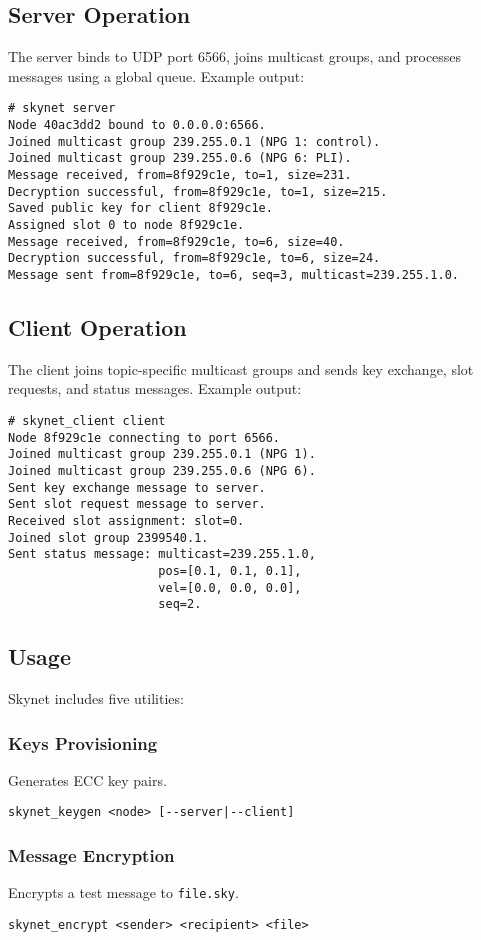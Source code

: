\documentclass{article}
\begin{document}
\subsection{Server Operation}
The server binds to UDP port 6566, joins multicast groups, and processes messages using a global
queue. Example output:
\begin{lstlisting}
# skynet server
Node 40ac3dd2 bound to 0.0.0.0:6566.
Joined multicast group 239.255.0.1 (NPG 1: control).
Joined multicast group 239.255.0.6 (NPG 6: PLI).
Message received, from=8f929c1e, to=1, size=231.
Decryption successful, from=8f929c1e, to=1, size=215.
Saved public key for client 8f929c1e.
Assigned slot 0 to node 8f929c1e.
Message received, from=8f929c1e, to=6, size=40.
Decryption successful, from=8f929c1e, to=6, size=24.
Message sent from=8f929c1e, to=6, seq=3, multicast=239.255.1.0.
\end{lstlisting}

\subsection{Client Operation}
The client joins topic-specific multicast groups and sends key exchange, slot requests, and status
messages. Example output:
\begin{lstlisting}
# skynet_client client
Node 8f929c1e connecting to port 6566.
Joined multicast group 239.255.0.1 (NPG 1).
Joined multicast group 239.255.0.6 (NPG 6).
Sent key exchange message to server.
Sent slot request message to server.
Received slot assignment: slot=0.
Joined slot group 2399540.1.
Sent status message: multicast=239.255.1.0,
                     pos=[0.1, 0.1, 0.1],
                     vel=[0.0, 0.0, 0.0],
                     seq=2.
\end{lstlisting}

\newpage
\subsection{Usage}
Skynet includes five utilities:

\subsubsection*{Keys Provisioning}
Generates ECC key pairs.
\begin{lstlisting}
skynet_keygen <node> [--server|--client]
\end{lstlisting}

\subsubsection*{Message Encryption}
Encrypts a test message to \texttt{file.sky}.
\begin{lstlisting}
skynet_encrypt <sender> <recipient> <file>
\end{lstlisting}
\end{document}
